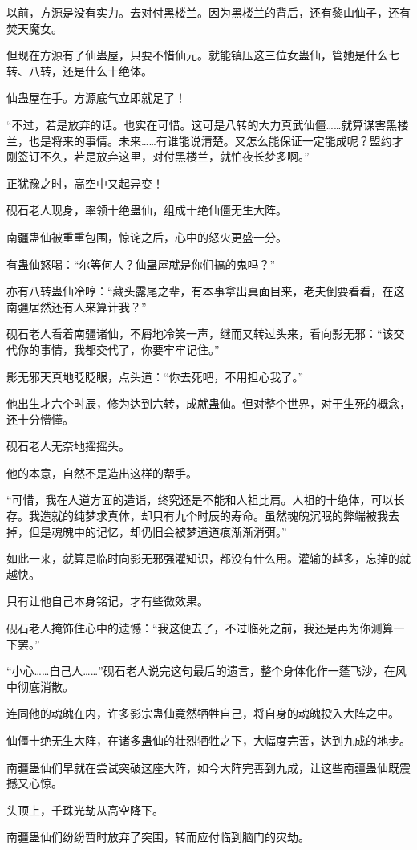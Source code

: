 \begin{this_body}
以前，方源是没有实力。去对付黑楼兰。因为黑楼兰的背后，还有黎山仙子，还有焚天魔女。

但现在方源有了仙蛊屋，只要不惜仙元。就能镇压这三位女蛊仙，管她是什么七转、八转，还是什么十绝体。

仙蛊屋在手。方源底气立即就足了！

“不过，若是放弃的话。也实在可惜。这可是八转的大力真武仙僵……就算谋害黑楼兰，也是将来的事情。未来……有谁能说清楚。又怎么能保证一定能成呢？盟约才刚签订不久，若是放弃这里，对付黑楼兰，就怕夜长梦多啊。”

正犹豫之时，高空中又起异变！

砚石老人现身，率领十绝蛊仙，组成十绝仙僵无生大阵。

南疆蛊仙被重重包围，惊诧之后，心中的怒火更盛一分。

有蛊仙怒喝：“尔等何人？仙蛊屋就是你们搞的鬼吗？”

亦有八转蛊仙冷哼：“藏头露尾之辈，有本事拿出真面目来，老夫倒要看看，在这南疆居然还有人来算计我？”

砚石老人看着南疆诸仙，不屑地冷笑一声，继而又转过头来，看向影无邪：“该交代你的事情，我都交代了，你要牢牢记住。”

影无邪天真地眨眨眼，点头道：“你去死吧，不用担心我了。”

他出生才六个时辰，修为达到六转，成就蛊仙。但对整个世界，对于生死的概念，还十分懵懂。

砚石老人无奈地摇摇头。

他的本意，自然不是造出这样的帮手。

“可惜，我在人道方面的造诣，终究还是不能和人祖比肩。人祖的十绝体，可以长存。我造就的纯梦求真体，却只有九个时辰的寿命。虽然魂魄沉眠的弊端被我去掉，但是魂魄中的记忆，却仍旧会被梦道道痕渐渐消弭。”

如此一来，就算是临时向影无邪强灌知识，都没有什么用。灌输的越多，忘掉的就越快。

只有让他自己本身铭记，才有些微效果。

砚石老人掩饰住心中的遗憾：“我这便去了，不过临死之前，我还是再为你测算一下罢。”

“小心……自己人……”砚石老人说完这句最后的遗言，整个身体化作一蓬飞沙，在风中彻底消散。

连同他的魂魄在内，许多影宗蛊仙竟然牺牲自己，将自身的魂魄投入大阵之中。

仙僵十绝无生大阵，在诸多蛊仙的壮烈牺牲之下，大幅度完善，达到九成的地步。

南疆蛊仙们早就在尝试突破这座大阵，如今大阵完善到九成，让这些南疆蛊仙既震撼又心惊。

头顶上，千珠光劫从高空降下。

南疆蛊仙们纷纷暂时放弃了突围，转而应付临到脑门的灾劫。

\end{this_body}

